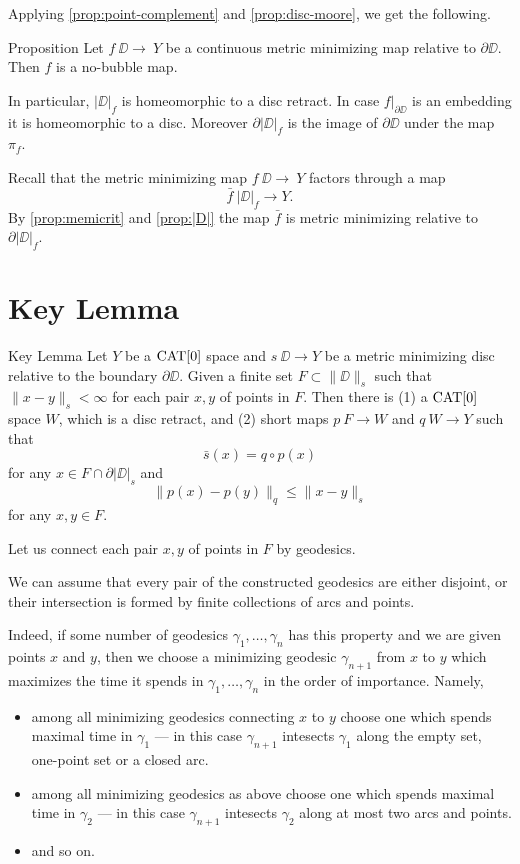 \documentclass[a4paper,10pt]{amsart}
\begin{document}
Applying \ref{prop:point-complement} and \ref{prop:disc-moore}, we get the following.

\begin{thm}{Proposition}\label{prop:|D|}
Let $f\:\DD\to\ Y$ be a continuous metric minimizing map relative to $\partial \DD$.
Then $f$ is a no-bubble map.

In particular,  $|\DD|_f$ is homeomorphic to a disc retract. In case $f|_{\partial\DD}$ is an
embedding it is homeomorphic to a disc.
Moreover $\partial|\DD|_f$ is the image of $\partial \DD$
under the map $\pi_f$.
\end{thm}

Recall that the metric minimizing map $f\:\DD\to\ Y$ factors through a map \[\bar f\:|\DD|_f\to Y.\]
By \ref{prop:memicrit} and \ref{prop:|D|} 
the map $\bar f$
is metric minimizing relative to $\partial|\DD|_f$.











\section{Key Lemma}


\begin{thm}{Key Lemma}\label{lem:key}
Let $Y$ be a $\mathop{\rm CAT}\nolimits[0]$ space and $s\:\DD\to Y$ 
be a metric minimizing disc relative to the boundary $\partial \DD$.
Given a finite set $F\subset \|\DD\|_s$ such that $\|x-y\|_s<\infty$ for each pair $x,y$ of points in $F$. Then
there is 
(1) a $\mathop{\rm CAT}\nolimits[0]$ space $W$, which is a disc retract,
and (2) short maps $p\:F\to W$ and $q\:W\to Y$ such that
\[\bar s(x)=q\circ p(x)\] 
for any $x\in F\cap \partial |\DD|_s$
and 
\[\|p(x)-p(y)\|_q\le \|x-y\|_s\] 
for any $x,y\in F$.
\end{thm}

Let us connect each pair $x,y$ of points in $F$ by geodesics.

We can assume that 
every pair of the constructed geodesics 
are either disjoint, or their intersection is formed by finite collections of arcs and points.

Indeed, if some number of geodesics $\gamma_1,\dots,\gamma_n$ has this property and we are given points $x$ and $y$, then
we choose a minimizing geodesic $\gamma_{n+1}$ from $x$ to $y$ which maximizes the time it spends in $\gamma_1,\dots,\gamma_n$  in the order of importance.
Namely, 
\begin{itemize}
\item  among all minimizing geodesics connecting $x$ to $y$
choose one which spends maximal time in $\gamma_1$ --- in this case $\gamma_{n+1}$ intesects $\gamma_1$ along the empty set, one-point set or a closed arc.
\item among all minimizing geodesics as above
choose one which spends maximal time in $\gamma_2$ --- in this case $\gamma_{n+1}$ intesects $\gamma_2$ along at most two arcs and points.
\item and so on.
\end{itemize}
\end{document}
